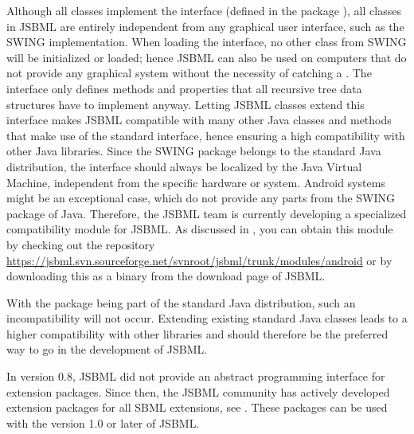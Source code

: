 \begin{description}
  Although all classes implement the \TreeNode interface (defined in
  the package ), all classes in JSBML are entirely
  independent from any graphical user interface, such as the
  SWING
  implementation. When loading the \TreeNode interface, no other
  class from SWING will be initialized or loaded; hence JSBML can also be
  used on computers that do not provide any graphical system without the
  necessity of catching a \HeadlessException. The \TreeNode
  interface only defines methods and properties that all recursive tree data
  structures have to implement anyway. Letting JSBML classes extend this
  interface makes JSBML compatible with many other Java classes and methods
  that make use of the standard \TreeNode interface, hence ensuring a
  high compatibility with other Java libraries. Since the SWING package
  belongs to the standard Java distribution, the
  \TreeNode interface should always be localized by the Java Virtual
  Machine, independent from the specific hardware or
  system. Android systems might be an exceptional case, which
  do not provide any parts from the SWING package of Java. Therefore, the
  JSBML team is currently developing a specialized 
  compatibility module for JSBML. As discussed in ,
  you can obtain this module by checking out the repository
  \url{https://jsbml.svn.sourceforge.net/svnroot/jsbml/trunk/modules/android} or by
  downloading this as a binary from the download page of JSBML.

\item[\parbox{\textwidth-5pt}{Does the usage of the \code{java.beans}
    package for the \code{TreeNodeChangeListener} lead to an
    incompatibility with light-weight Java installations?}]

  With the  package being part of the standard Java
  distribution, such an incompatibility will not occur. Extending existing
  standard Java classes leads to a higher compatibility with other
  libraries and should therefore be the preferred way to go in the
  development of JSBML.

\item[\parbox{\textwidth-5pt}{Does JSBML support SBML extension packages?}]

  In version 0.8, JSBML did not provide an abstract programming interface
  for extension packages.%
   Since then, the JSBML community has
  actively developed extension packages for all SBML extensions, 
  see . These packages can be used with the
  version 1.0 or later of JSBML.

\end{description}

